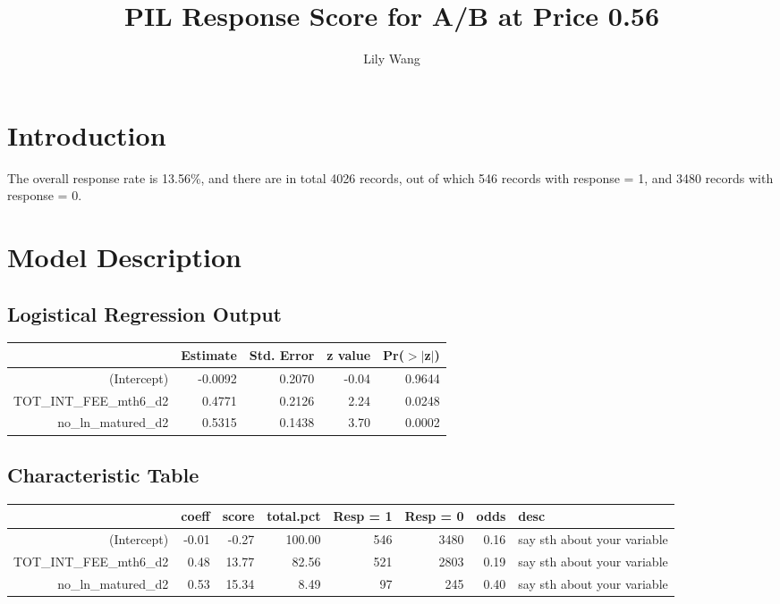 \documentclass[a4paper]{article}
\title{PIL Response Score for A/B at Price 0.56}
\author{Lily Wang}
\begin{document}
\maketitle
{}


\section{Introduction}

The overall response rate is 13.56\%, 
and there are in total 4026 records, out of which 546 
records with response = 1, and 3480 records with response = 0. 


\section{Model Description}
\subsection{Logistical Regression Output}
\begin{table}[ht]
\begin{center}
\begin{tabular}{rrrrr}
  \hline
 & Estimate & Std. Error & z value & Pr($>$$|$z$|$) \\ 
  \hline
(Intercept) & -0.0092 & 0.2070 & -0.04 & 0.9644 \\ 
  TOT\_INT\_FEE\_mth6\_d2 & 0.4771 & 0.2126 & 2.24 & 0.0248 \\ 
  no\_ln\_matured\_d2 & 0.5315 & 0.1438 & 3.70 & 0.0002 \\ 
   \hline
\end{tabular}
\end{center}
\end{table}
\subsection{Characteristic Table}
\begin{table}[ht]
\begin{center}
\begin{tabular}{rrrrrrrl}
  \hline
 & coeff & score & total.pct & Resp = 1 & Resp = 0 & odds & desc \\ 
  \hline
(Intercept) & -0.01 & -0.27 & 100.00 & 546 & 3480 & 0.16 & say sth 
 about your variable \\ 
  TOT\_INT\_FEE\_mth6\_d2 & 0.48 & 13.77 & 82.56 & 521 & 2803 & 0.19 & say sth 
 about your variable \\ 
  no\_ln\_matured\_d2 & 0.53 & 15.34 & 8.49 & 97 & 245 & 0.40 & say sth 
 about your variable \\ 
   \hline
\end{tabular}
\end{center}
\end{table}
\end{document}
